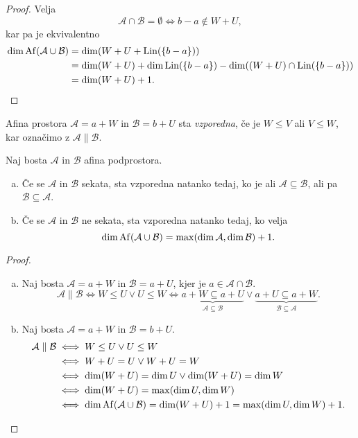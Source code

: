 \begin{proof}
	Velja
    \[
        \mathcal{A} \cap \mathcal{B} = \emptyset \iff b - a \notin W + U,
    \]
    kar pa je ekvivalentno
    \begin{align*}
        \dim \operatorname{Af} ( \mathcal{A} \cup \mathcal{B} ) &= \dim (W + U + \operatorname{Lin} (\left\{b-a\right\})) \\
        &= \dim (W + U) + \dim \operatorname{Lin} (\left\{b-a\right\}) - \dim ((W + U) \cap \operatorname{Lin} (\left\{b-a\right\})) \\
        &= \dim (W + U) + 1. \qedhere
    \end{align*}
\end{proof}

\begin{definicija}
    Afina prostora $\mathcal{A} = a + W$ in $\mathcal{B} = b + U$ sta \emph{vzporedna}, če je $W \leq V$ ali $V \leq W$, kar označimo z $\mathcal{A} \parallel \mathcal{B}$. 
\end{definicija}

\begin{trditev}
    Naj bosta $\mathcal{A}$ in $\mathcal{B}$ afina podprostora. 

	\begin{enumerate}[a)]
	\item Če se $\mathcal{A}$ in $\mathcal{B}$ sekata, sta vzporedna natanko tedaj, ko je ali $\mathcal{A} \subseteq \mathcal{B}$, ali pa $\mathcal{B} \subseteq \mathcal{A}$.

    \item Če se $\mathcal{A}$ in $\mathcal{B}$ ne sekata, sta vzporedna natanko tedaj, ko velja 
    \[
        \dim \operatorname{Af} (\mathcal{A} \cup \mathcal{B}) = \max (\dim \mathcal{A}, \dim \mathcal{B}) + 1.
    \]
    \end{enumerate}
\end{trditev}

\begin{proof}
    \begin{enumerate}[a)]
	\item Naj bosta $\mathcal{A} = a + W$ in $\mathcal{B} = a + U$, kjer je $a \in \mathcal{A} \cap \mathcal{B}$.
    \[
    \mathcal{A} \parallel \mathcal{B} \iff W \leq U \lor U \leq W \iff \underbrace{a + W \subseteq a + U}_{\mathcal{A} \subseteq \mathcal{B}} \lor \underbrace{a + U \subseteq a + W}_{\mathcal{B} \subseteq \mathcal{A}}.
    \]

    \item Naj bosta $\mathcal{A} = a + W$ in $\mathcal{B} = b + U$.
    \begin{align*}
        \mathcal{A} \parallel \mathcal{B} &\iff W \leq U \lor U \leq W \\
        &\iff W + U = U \lor W + U = W \\
        &\iff \dim (W + U) = \dim U \lor \dim (W + U) = \dim W \\
        &\iff \dim (W + U) = \max (\dim U, \dim W) \\
        &\iff \dim \operatorname{Af} (\mathcal{A} \cup \mathcal{B}) = \dim (W + U) + 1 = \max (\dim U, \dim W) + 1. \qedhere
    \end{align*}
    \end{enumerate}
\end{proof}

